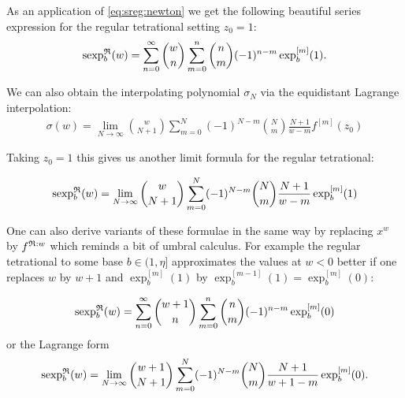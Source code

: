 \documentclass{article}
\numberwithin{equation}{section}
\begin{document}
As an application of \eqref{eq:sreg:newton} we get the following beautiful series expression for
the regular tetrational setting $z_0=1$:
\begin{align}\label{eq:rsexp:newton}
  \operatorname{sexp}^{\mathfrak{R}}_b(w)=\sum_{n=0}^\infty
  \binom{w}{n} \sum_{m=0}^n \binom{n}{m} (-1)^{n-m} \exp_b^{[m]}(1)
.\end{align}

We can also obtain the interpolating polynomial $\sigma_N$ via 
the equidistant Lagrange interpolation:
\begin{align}
  \sigma(w)=\lim_{N\to\infty}\binom{w}{N+1}\sum_{m=0}^N (-1)^{N-m} \binom{N}{m}
  \frac{N+1}{w-m}{f^{[m]}(z_0)}
\end{align}

Taking $z_0=1$ this gives us another limit formula for the
regular tetrational:

\begin{align}\label{eq:rsexp:lagrange}
  \operatorname{sexp}^{\mathfrak{R}}_b(w)=\lim_{N\to\infty}\binom{w}{N+1}\sum_{m=0}^N (-1)^{N-m} \binom{N}{m}
  \frac{N+1}{w-m}\exp_b^{[m]}(1)
\end{align}

One can also derive variants of these formulae in the same way by
replacing $x^w$ by ${f}^{\mathfrak{R}:w}$ which reminds a bit of umbral
calculus. For example the regular tetrational 
to some base $b\in (1,\eta]$ approximates the values at $w<0$ 
better if one replaces $w$ by $w+1$ and $\exp_b^{[m]}(1)$ by
$\exp_b^{[m-1]}(1)=\exp_b^{[m]}(0)$:

\begin{align}\label{eq:rsexp:newton:inc}
  \operatorname{sexp}^{\mathfrak{R}}_b(w)=\sum_{n=0}^\infty
  \binom{w+1}{n} \sum_{m=0}^n \binom{n}{m} (-1)^{n-m} \exp_b^{[m]}(0)
\end{align}
or the Lagrange form
\begin{align}
  \operatorname{sexp}^{\mathfrak{R}}_b(w)=\lim_{N\to\infty}\binom{w+1}{N+1}\sum_{m=0}^N (-1)^{N-m} \binom{N}{m}
  \frac{N+1}{w+1-m} \exp_b^{[m]}(0).
\end{align}


\end{document}
